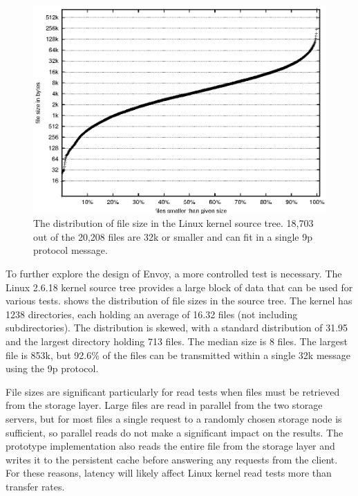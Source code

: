 \begin{figure}[t]
\centering
\includegraphics[width=\figwidth]{figures/linux-sizes}
\caption[Distribution of Linux kernel file sizes]{The distribution of file size in the Linux kernel source tree. 18,703 out of the 20,208 files are 32k or smaller and can fit in a single 9p protocol message.}
\label{fig:linux-sizes}
\end{figure}

To further explore the design of Envoy, a more controlled test is necessary. The Linux 2.6.18 kernel source tree provides a large block of data that can be used for various tests.  shows the distribution of file sizes in the source tree. The kernel has 1238 directories, each holding an average of 16.32 files (not including subdirectories). The distribution is skewed, with a standard distribution of 31.95 and the largest directory holding 713 files. The median size is 8 files. The largest file is 853k, but 92.6\% of the files can be transmitted within a single 32k message using the 9p protocol.

File sizes are significant particularly for read tests when files must be retrieved from the storage layer. Large files are read in parallel from the two storage servers, but for most files a single request to a randomly chosen storage node is sufficient, so parallel reads do not make a significant impact on the results. The prototype implementation also reads the entire file from the storage layer and writes it to the persistent cache before answering any requests from the client. For these reasons, latency will likely affect Linux kernel read tests more than transfer rates.

